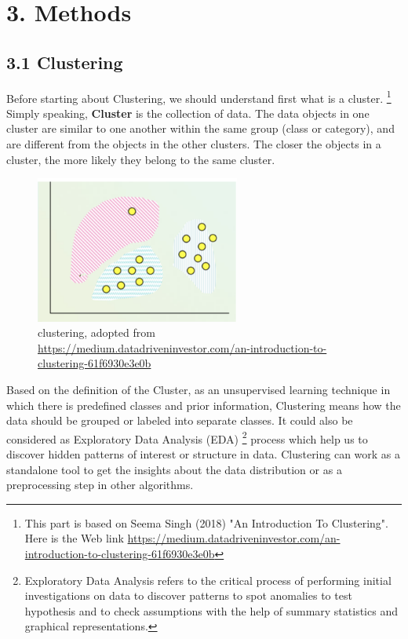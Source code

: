 \documentclass[nobib]{tufte-handout}
\begin{document}


\clearpage
\bigskip
\section{\textbf{3. Methods}}
\subsection{\textbf{3.1 Clustering}}


Before starting about Clustering, we should understand first what is a cluster. \footnote{This part is based on Seema Singh
 (2018) "An Introduction To Clustering". Here is the Web link \url{https://medium.datadriveninvestor.com/an-introduction-to-clustering-61f6930e3e0b}} Simply speaking,  \textbf{Cluster} is the collection of data. The data objects in one cluster are similar to one another within the same group (class or category),  and are different from the objects in the other clusters. 
The closer the objects in a cluster, the more likely they belong to the same cluster.

\begin{figure}
 \includegraphics[width=0.6\textwidth]{clustering.png}
  \caption{clustering, adopted from \url{https://medium.datadriveninvestor.com/an-introduction-to-clustering-61f6930e3e0b}}
\end{figure}

Based on the definition of the Cluster,  as an unsupervised learning technique in which there is predefined classes and prior information, Clustering means how the data should be grouped or labeled into separate classes. 
It could also be considered as Exploratory Data Analysis (EDA) \footnote{Exploratory Data Analysis refers to the critical process of performing initial investigations on data to discover patterns to spot anomalies to test hypothesis and to check assumptions with the help of summary statistics and graphical representations.} process which help us to discover hidden patterns of interest or structure in data. Clustering can work as a standalone tool to get the insights about the data distribution or as a preprocessing step in other algorithms.
\end{document}
